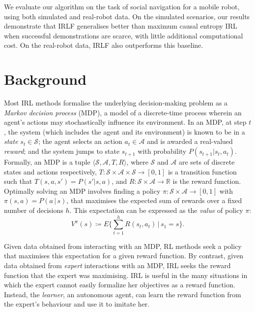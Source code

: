 \documentclass[letterpaper]{article}
\newcommand{\jm}[1]{\textcolor{blue}{Joao: #1}}
\newcommand{\jm}[1]{}
\begin{document}
We evaluate our algorithm on the task of social navigation for a mobile robot, using both simulated and real-robot data. On the simulated scenarios, our results demonstrate that IRLF generalises better than maximum causal entropy IRL when successful demonstrations are scarce, with little additional computational cost.  On the real-robot data, IRLF also outperforms this baseline. 



\section{Background}
Most IRL methods formalise the underlying decision-making problem as a \emph{Markov decision process} (MDP), a model of a discrete-time process wherein an agent's actions may stochastically influence its environment. In an MDP, at step $t$, the system (which includes the agent and its environment) is known to be in a \emph{state} $s_t\in\mathcal{S}$; the agent selects an action $a_t\in\mathcal{A}$ and is awarded a real-valued \emph{reward}; and the system jumps to state $s_{t+1}$ with probability $P(s_{t+1}|s_t,a_t)$. Formally, an MDP is a tuple $\langle\mathcal{S},\mathcal{A},T,R\rangle$, where $\mathcal{S}$ and $\mathcal{A}$ are sets of discrete states and actions respectively, $T:\mathcal{S}\times\mathcal{A}\times\mathcal{S}\rightarrow [0,1]$ is a transition function such that $T(s,a,s')=P(s'|s,a)$, and $R:\mathcal{S}\times\mathcal{A}\rightarrow\mathbb R$ is the reward function. 
Optimally solving an MDP involves finding a policy $\pi:\mathcal{S}\times\mathcal{A}\rightarrow[0,1]$ with $\pi(s,a) = P(a\,|\,s)$, that maximises the expected sum of rewards over a fixed number of decisions $h$. This expectation can be expressed as the \emph{value} of policy $\pi$:
\begin{equation}
\label{eq:value}
 V^\pi(s) \coloneqq E\{\sum_{t = 1}^hR(s_t,a_t)\,\vert\, s_1 = s\}.
\end{equation}

Given data obtained from interacting with an MDP, RL methods seek a policy that maximises this expectation for a given reward function.  By contrast, given data obtained from \emph{expert} interactions with an MDP, IRL seeks the reward function that the expert was maximising.  IRL is useful in the many situations in which the expert cannot easily formalize her objectives as a reward function.  Instead, the \emph{learner}, an autonomous agent, can learn the reward function from the expert's behaviour and use it to imitate her.
\end{document}
